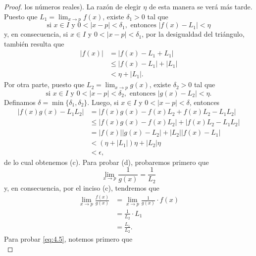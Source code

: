 \documentclass[12pt,a4paper]{book}
\begin{document}
\begin{proof}
        los números reales). La razón de elegir $\eta$ de esta manera se verá más tarde.
        Puesto que $L_{1}=\lim_{x\to p}f(x)$, existe $\delta_{1}>0$ tal que
        \begin{equation*}
            \text{si }x\in I\text{ y }0<|x-p|<\delta_{1},\text{ entonces }|f(x)-L_{1}|<\eta
        \end{equation*}
        y, en consecuencia, si $x\in I$ y $0<|x-p|<\delta_{1}$, por la desigualdad del
        triángulo, también resulta que
        \begin{align*}
            |f(x)|&=|f(x)-L_{1}+L_{1}|\\
            &\leq|f(x)-L_{1}|+|L_{1}|\\
            &<\eta+|L_{1}|.
        \end{align*}
        Por otra parte, puesto que $L_{2}=\lim_{x\to p}g(x)$, existe $\delta_{2}>0$ tal que
        \begin{equation*}
            \text{si }x\in I\text{ y }0<|x-p|<\delta_{2},\text{ entonces }|g(x)-L_{2}|<\eta.
        \end{equation*}
        Definamos $\delta=\min\{\delta_{1},\delta_{2}\}$. Luego, si $x\in I$ y $0<|x-p|<\delta$, entonces
        \begin{align*}
            |f(x)g(x)-L_{1}L_{2}|&=|f(x)g(x)-f(x)L_{2}+f(x)L_{2}-L_{1}L_{2}|\\
            &\leq|f(x)g(x)-f(x)L_{2}|+|f(x)L_{2}-L_{1}L_{2}|\\
            &=|f(x)||g(x)-L_{2}|+|L_{2}||f(x)-L_{1}|\\
            &<(\eta+|L_{1}|)\eta+|L_{2}|\eta\\
            &<\epsilon,
        \end{align*}
        de lo cual obtenemos (c). Para probar (d), probaremos primero que
        \begin{equation}\label{eq:4.5}
            \lim_{x\to p}\frac{1}{g(x)}=\frac{1}{L_{2}}
        \end{equation}
        y, en consecuencia, por el inciso (c), tendremos que
        \begin{align*}
            \lim_{x\to p}\frac{f(x)}{g(x)}&=\lim_{x\to p}\frac{1}{g(x)}\cdot f(x)\\
            &=\frac{1}{L_{2}}\cdot L_{1}\\
            &=\frac{L_{1}}{L_{2}}.
        \end{align*}
        Para probar \eqref{eq:4.5}, notemos primero que
        \begin{equation*}

\end{equation*}
\end{proof}
\end{document}
